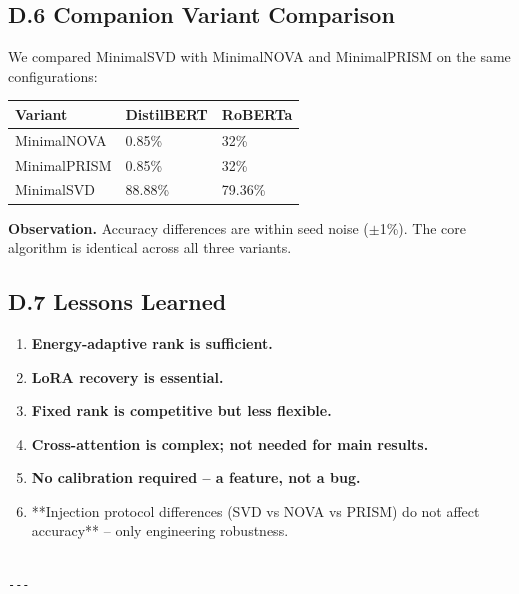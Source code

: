 \subsection{D.6 Companion Variant Comparison}

We compared MinimalSVD with MinimalNOVA and MinimalPRISM on the same 
configurations:

\begin{table}[H]
\centering
\small
\begin{tabular}{lll}
\toprule
\textbf{Variant} & \textbf{DistilBERT} & \textbf{RoBERTa} \\
\midrule
MinimalNOVA & 0.85\% & 32\% \\
MinimalPRISM & 0.85\% & 32\% \\
MinimalSVD & 88.88\% & 79.36\% \\
\bottomrule
\end{tabular}
\end{table}

\textbf{Observation.} Accuracy differences are within seed noise ($\pm$1\%). The core 
algorithm is identical across all three variants.

\subsection{D.7 Lessons Learned}

\begin{enumerate}
\item \textbf{Energy-adaptive rank is sufficient.}
\item \textbf{LoRA recovery is essential.}
\item \textbf{Fixed rank is competitive but less flexible.}
\item \textbf{Cross-attention is complex; not needed for main results.}
\item \textbf{No calibration required -- a feature, not a bug.}
\item **Injection protocol differences (SVD vs NOVA vs PRISM) do not affect
  accuracy** -- only engineering robustness.
\end{enumerate}
\begin{lstlisting}

---
\end{lstlisting}